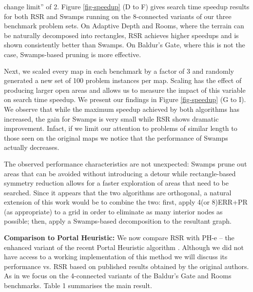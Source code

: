 change limit'' of 2.
Figure \ref{fig-speedup} (D to F) gives search time speedup results for both RSR
and Swamps running on the 8-connected variants of our three benchmark problem
sets. 
On Adaptive Depth and Rooms, where the terrain can be naturally decomposed into
rectangles, RSR achieves higher speedups and is shown consistently better than Swamps. 
On Baldur's Gate, where this is not the case, Swamps-based pruning is more
effective. 
\par
Next, we scaled every map in each benchmark by a factor of 3 and randomly
generated a new set of 100 problem instances per map.  Scaling has the effect of
producing larger open areas and allows us to measure the impact of this variable
on search time speedup.  We present our findings in  Figure \ref{fig-speedup} (G
to I).  We observe that while the maximum speedup achieved by both algorithms
has increased, the gain for Swamps is very small while RSR shows dramatic
improvement.  Infact, if we limit our attention to problems of similar length to
those seen on the original maps we notice that the performance of Swamps
actually decreases.
\par
The observed performance characteristics are not unexpected: Swamps prune out
areas that can be avoided without introducing a detour while rectangle-based
symmetry reduction allows for a faster exploration of areas that need to be
searched.  Since it appears that the two algorithms are orthogonal, a natural
extension of this work would be to combine the two: first, apply 4(or 8)ERR+PR
(as appropriate) to a grid in order to eliminate as many interior nodes as
possible; then, apply a Swamps-based decomposition to the resultant graph.
\par
\textbf{Comparison to Portal Heuristic:}
We now compare RSR with PH-e -- the enhanced variant of the recent 
Portal Heuristic algorithm \cite{goldenberg10}.
Although we did not have access to a working implementation of this method we
will discuss its performance vs. RSR based on published results obtained by the
original authors. As in \cite{goldenberg10} we focus on the 4-connected variants 
of the Baldur's Gate and Rooms benchmarks.
Table 1 summarises the main result.

